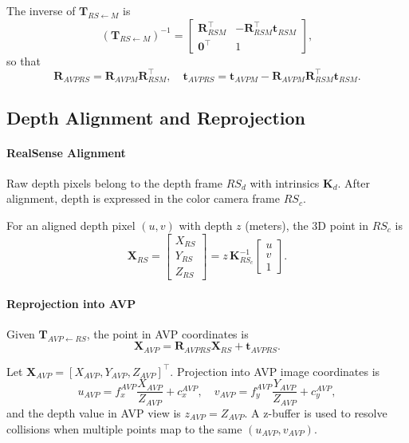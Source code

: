 \documentclass[11pt]{article}
\begin{document}
The inverse of $\mathbf{T}_{RS \leftarrow M}$ is
\[
\left( \mathbf{T}_{RS \leftarrow M} \right)^{-1} =
\begin{bmatrix}
\mathbf{R}_{RSM}^\top & -\mathbf{R}_{RSM}^\top \mathbf{t}_{RSM} \\
\mathbf{0}^\top & 1
\end{bmatrix},
\]
so that
\[
\mathbf{R}_{AVPRS} = \mathbf{R}_{AVPM} \mathbf{R}_{RSM}^\top,
\quad
\mathbf{t}_{AVPRS} = \mathbf{t}_{AVPM} - \mathbf{R}_{AVPM} \mathbf{R}_{RSM}^\top \mathbf{t}_{RSM}.
\]

\subsection{Depth Alignment and Reprojection}

\paragraph{RealSense Alignment}

Raw depth pixels belong to the depth frame $RS_d$ with intrinsics $\mathbf{K}_d$. After alignment, depth is expressed in the color camera frame $RS_c$.

For an aligned depth pixel $(u,v)$ with depth $z$ (meters), the 3D point in $RS_c$ is
\[
\mathbf{X}_{RS} =
\begin{bmatrix}
X_{RS} \\ Y_{RS} \\ Z_{RS}
\end{bmatrix}
=
z \, \mathbf{K}_{RS_c}^{-1}
\begin{bmatrix}
u \\ v \\ 1
\end{bmatrix}.
\]

\paragraph{Reprojection into AVP}

Given $\mathbf{T}_{AVP \leftarrow RS}$, the point in AVP coordinates is
\[
\mathbf{X}_{AVP} =
\mathbf{R}_{AVPRS} \mathbf{X}_{RS} + \mathbf{t}_{AVPRS}.
\]

Let $\mathbf{X}_{AVP} = [X_{AVP},Y_{AVP},Z_{AVP}]^\top$. Projection into AVP image coordinates is
\[
u_{AVP} = f_x^{AVP} \frac{X_{AVP}}{Z_{AVP}} + c_x^{AVP}, \quad
v_{AVP} = f_y^{AVP} \frac{Y_{AVP}}{Z_{AVP}} + c_y^{AVP},
\]
and the depth value in AVP view is $z_{AVP} = Z_{AVP}$. A z-buffer is used to resolve collisions when multiple points map to the same $(u_{AVP},v_{AVP})$.
\end{document}
